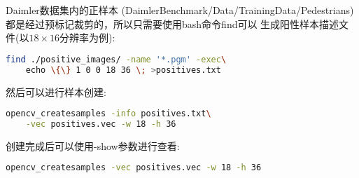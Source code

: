 Daimler数据集内的正样本
(\textsf{DaimlerBenchmark/Data/TrainingData/Pedestrians})
都是经过预标记裁剪的，所以只需要使用\textsf{bash}命令\textsf{find}可以
生成阳性样本描述文件(以$18\times16$分辨率为例):
\begin{lstlisting}[language=bash]
find ./positive_images/ -name '*.pgm' -exec\
	echo \{\} 1 0 0 18 36 \; >positives.txt
\end{lstlisting}
然后可以进行样本创建:
\begin{lstlisting}[language=bash]
opencv_createsamples -info positives.txt\
	-vec positives.vec -w 18 -h 36
\end{lstlisting}
创建完成后可以使用\textsf{-show}参数进行查看:
\begin{lstlisting}[language=bash]
opencv_createsamples -vec positives.vec -w 18 -h 36
\end{lstlisting}

